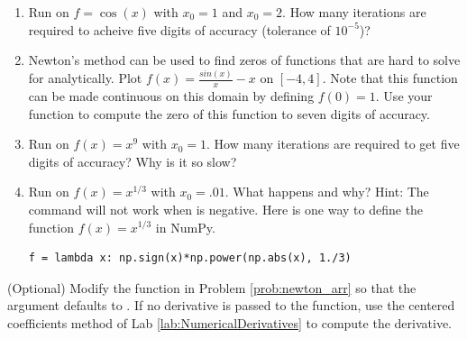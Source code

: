 \begin{problem}
\leavevmode
\begin{enumerate}
\item Run  on $f=\cos(x)$ with $x_0=1$ and $x_0=2$.
How many iterations are required to acheive five digits of accuracy (tolerance of $10^{-5}$)?
\item Newton's method can be used to find zeros of functions that are hard to solve for analytically.
Plot $f(x) = \frac{sin(x)}{x}-x$ on $[-4, 4]$.
Note that this function can be made continuous on this domain by defining $f(0)=1$.
Use your function  to compute the zero of this function to seven digits of accuracy.
\item Run  on $f(x)=x^9$ with $x_0=1$.
How many iterations are required to get five digits of accuracy?  Why is it so slow?
\item Run  on $f(x)=x^{1/3}$ with $x_0=.01$.
What happens and why?
Hint: The command  will not work when  is negative.
Here is one way to define the function $f(x)=x^{1/3}$ in NumPy.
\begin{lstlisting}
f = lambda x: np.sign(x)*np.power(np.abs(x), 1./3)
\end{lstlisting}
\end{enumerate}
\end{problem}

\begin{problem}(Optional)
Modify the function  in Problem \ref{prob:newton_arr} so that the argument  defaults to .
If no derivative is passed to the function, use the centered coefficients method of Lab \ref{lab:NumericalDerivatives} to compute the derivative.
\end{problem}

